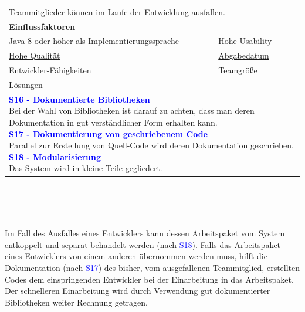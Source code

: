 \documentclass[enabledeprecatedfontcommands,fontsize=11pt,paper=a4,twoside]{scrartcl}
\newcounter{one}
\newcommand{\cb}[1]{{\textcolor{blue}{#1}}}
\begin{document}
\hspace{-0.65cm}
\begin{tabular} {|p{8cm} p{8cm}|}
	\hline
	\rowcolor{prob}\multicolumn{2}{|l|}{\parbox{16cm}{\textbf{06: Ausfallende Entwickler}}} \\  \hline\hline 
	\multicolumn{2}{|l|}{\parbox{16cm}{Teammitglieder können im Laufe der Entwicklung ausfallen.}}\rule{0pt}{1ex}\\ [1ex] \hline
	\multicolumn{2}{|l|}{\textbf{Einflussfaktoren}}\\
	\hyperlink{b}{Java 8 oder höher als Implementierungssprache} &
	\hyperlink {g}{Hohe Usability}\\
	\hyperlink {h}{Hohe Qualität}&
	\hyperlink {uu}{Abgabedatum} \\
	\hyperlink {vv}{Entwickler-Fähigkeiten} &
	\hyperlink {xx}{Teamgröße} 
	\\ \hline
	\multicolumn{2}{|l|}{Lösungen} \\
	\multicolumn{2}{|l|}{\parbox{16cm}{
			\textbf{\cb{\hypertarget{ddd}{S16 - Dokumentierte Bibliotheken}}}\\
			Bei der Wahl von Bibliotheken ist darauf zu achten, dass man deren Dokumentation in gut verständlicher Form erhalten kann. \\
			\textbf{\cb{S17 - Dokumentierung von geschriebenem Code}}\\
			Parallel zur Erstellung von Quell-Code wird deren Dokumentation geschrieben.\\
			\textbf{\cb{S18 - Modularisierung}} \\
			Das System wird in kleine Teile gegliedert.
	}}\\ [4ex] \hline
\end{tabular}\\ \\ \\
\begin{onehalfspace}
	Im Fall des Ausfalles eines Entwicklers kann dessen Arbeitspaket vom System entkoppelt und separat behandelt werden (nach \cb{S18}). Falls das Arbeitspaket eines Entwicklers von einem anderen übernommen werden muss, hilft die Dokumentation (nach \cb{S17}) des bisher, vom ausgefallenen Teammitglied, erstellten Codes dem einspringenden Entwickler bei der Einarbeitung in das Arbeitspaket. Der schnelleren Einarbeitung wird durch Verwendung gut dokumentierter Bibliotheken weiter Rechnung getragen.
\end{onehalfspace}
\end{document}
